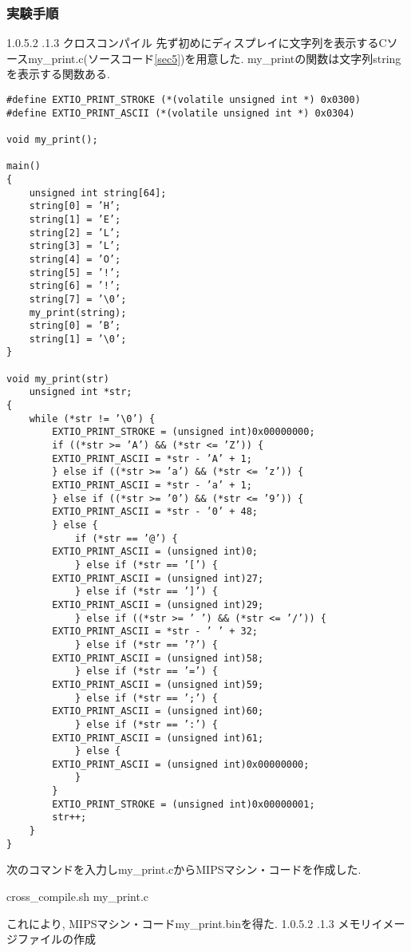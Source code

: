 \documentclass[epsf,a4paper,dvipdfmx,autodetect-engine,titlepage]{jsarticle}
\makeatletter
\newcommand{\subsubsubsection}
{\@startsection{paragraph}{4}{\z@}%
{1.0\Cvs \@plus.5\Cdp \@minus.2\Cdp}%
{.1\Cvs \@plus.3\Cdp}%
{\reset@font\sffamily\normalsize}}
\makeatother
\begin{document}
\subsubsection{実験手順}
\subsubsubsection{クロスコンパイル}
先ず初めにディスプレイに文字列を表示するCソースmy\_print.c(ソースコード\ref{sec5})を用意した. my\_printの関数は文字列stringを表示する関数ある.
\begin{lstlisting}[caption=mt\_print.c, label=sec5]
#define EXTIO_PRINT_STROKE (*(volatile unsigned int *) 0x0300)
#define EXTIO_PRINT_ASCII (*(volatile unsigned int *) 0x0304)

void my_print();

main()
{
    unsigned int string[64];
    string[0] = ’H’;
    string[1] = ’E’;
    string[2] = ’L’;
    string[3] = ’L’;
    string[4] = ’O’;
    string[5] = ’!’;
    string[6] = ’!’;
    string[7] = ’\0’;
    my_print(string);
    string[0] = ’B’;
    string[1] = ’\0’;
}

void my_print(str)
    unsigned int *str;
{
    while (*str != ’\0’) {
        EXTIO_PRINT_STROKE = (unsigned int)0x00000000;
        if ((*str >= ’A’) && (*str <= ’Z’)) {
        EXTIO_PRINT_ASCII = *str - ’A’ + 1;
        } else if ((*str >= ’a’) && (*str <= ’z’)) {
        EXTIO_PRINT_ASCII = *str - ’a’ + 1;
        } else if ((*str >= ’0’) && (*str <= ’9’)) {
        EXTIO_PRINT_ASCII = *str - ’0’ + 48;
        } else {
            if (*str == ’@’) {
        EXTIO_PRINT_ASCII = (unsigned int)0;
            } else if (*str == ’[’) {
        EXTIO_PRINT_ASCII = (unsigned int)27;
            } else if (*str == ’]’) {
        EXTIO_PRINT_ASCII = (unsigned int)29;
            } else if ((*str >= ’ ’) && (*str <= ’/’)) {
        EXTIO_PRINT_ASCII = *str - ’ ’ + 32;
            } else if (*str == ’?’) {
        EXTIO_PRINT_ASCII = (unsigned int)58;
            } else if (*str == ’=’) {
        EXTIO_PRINT_ASCII = (unsigned int)59;
            } else if (*str == ’;’) {
        EXTIO_PRINT_ASCII = (unsigned int)60;
            } else if (*str == ’:’) {
        EXTIO_PRINT_ASCII = (unsigned int)61;
            } else {
        EXTIO_PRINT_ASCII = (unsigned int)0x00000000;
            }
        }
        EXTIO_PRINT_STROKE = (unsigned int)0x00000001;
        str++;
    }
}
\end{lstlisting}
次のコマンドを入力しmy\_print.cからMIPSマシン・コードを作成した.
\begin{screen}
cross\_compile.sh my\_print.c
\end{screen}
これにより, MIPSマシン・コードmy\_print.binを得た.
\subsubsubsection{メモリイメージファイルの作成}
\end{document}
